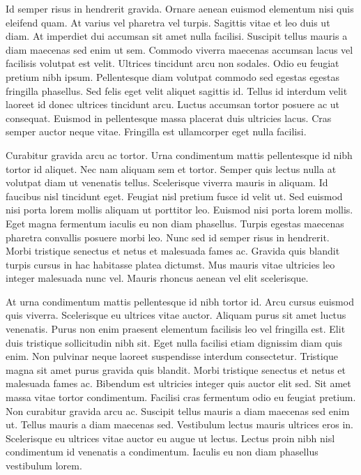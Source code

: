 \documentclass[twocolumn,twoside]{base/ajstd}
\begin{document}
Id semper risus in hendrerit gravida. Ornare aenean euismod elementum nisi quis eleifend quam. At varius vel pharetra vel turpis. Sagittis vitae et leo duis ut diam. At imperdiet dui accumsan sit amet nulla facilisi. Suscipit tellus mauris a diam maecenas sed enim ut sem. Commodo viverra maecenas accumsan lacus vel facilisis volutpat est velit. Ultrices tincidunt arcu non sodales. Odio eu feugiat pretium nibh ipsum. Pellentesque diam volutpat commodo sed egestas egestas fringilla phasellus. Sed felis eget velit aliquet sagittis id. Tellus id interdum velit laoreet id donec ultrices tincidunt arcu. Luctus accumsan tortor posuere ac ut consequat. Euismod in pellentesque massa placerat duis ultricies lacus. Cras semper auctor neque vitae. Fringilla est ullamcorper eget nulla facilisi.

Curabitur gravida arcu ac tortor. Urna condimentum mattis pellentesque id nibh tortor id aliquet. Nec nam aliquam sem et tortor. Semper quis lectus nulla at volutpat diam ut venenatis tellus. Scelerisque viverra mauris in aliquam. Id faucibus nisl tincidunt eget. Feugiat nisl pretium fusce id velit ut. Sed euismod nisi porta lorem mollis aliquam ut porttitor leo. Euismod nisi porta lorem mollis. Eget magna fermentum iaculis eu non diam phasellus. Turpis egestas maecenas pharetra convallis posuere morbi leo. Nunc sed id semper risus in hendrerit. Morbi tristique senectus et netus et malesuada fames ac. Gravida quis blandit turpis cursus in hac habitasse platea dictumst. Mus mauris vitae ultricies leo integer malesuada nunc vel. Mauris rhoncus aenean vel elit scelerisque.

At urna condimentum mattis pellentesque id nibh tortor id. Arcu cursus euismod quis viverra. Scelerisque eu ultrices vitae auctor. Aliquam purus sit amet luctus venenatis. Purus non enim praesent elementum facilisis leo vel fringilla est. Elit duis tristique sollicitudin nibh sit. Eget nulla facilisi etiam dignissim diam quis enim. Non pulvinar neque laoreet suspendisse interdum consectetur. Tristique magna sit amet purus gravida quis blandit. Morbi tristique senectus et netus et malesuada fames ac. Bibendum est ultricies integer quis auctor elit sed. Sit amet massa vitae tortor condimentum. Facilisi cras fermentum odio eu feugiat pretium. Non curabitur gravida arcu ac. Suscipit tellus mauris a diam maecenas sed enim ut. Tellus mauris a diam maecenas sed. Vestibulum lectus mauris ultrices eros in. Scelerisque eu ultrices vitae auctor eu augue ut lectus. Lectus proin nibh nisl condimentum id venenatis a condimentum. Iaculis eu non diam phasellus vestibulum lorem.
\end{document}
